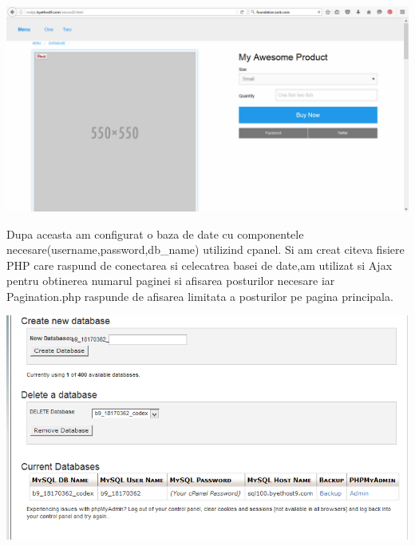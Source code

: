 \begin{flushleft}
\includegraphics[scale=0.5]{images/mini_store}
\end{flushleft}
Dupa aceasta am configurat o baza de date cu componentele necesare(username,password,db\_name) utilizind cpanel.
Si am creat citeva fisiere PHP care raspund de conectarea si celecatrea basei de date,am utilizat si Ajax pentru obtinerea numarul paginei si afisarea posturilor necesare iar Pagination.php raspunde de afisarea limitata a posturilor pe pagina principala.
\begin{center}
\includegraphics[scale=0.6]{images/database_config}
\end{center}
\clearpage
